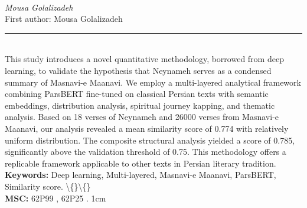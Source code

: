\documentclass[10pt,twoside]{article}
\begin{document}
\noindent\begin{minipage}[t][\textheight]{\textwidth}
\\[0.35em]
{\itshape Mousa Golalizadeh}\\[0.2em]
{\footnotesize First author: Mousa Golalizadeh}\\[0.45em]
\noindent\rule{\textwidth}{0.3pt}\\[0.4em]
{\footnotesize  This study introduces a novel quantitative methodology, borrowed from deep learning, to validate the hypothesis that Neynameh serves as a condensed summary of Masnavi-e Maanavi. We employ a multi-layered analytical framework combining ParsBERT fine-tuned on classical Persian texts with semantic embeddings, distribution analysis, spiritual journey kapping, and thematic analysis. Based on 18 verses of Neynameh and 26000 verses from Masnavi-e Maanavi, our analysis revealed a mean similarity score of 0.774 with relatively uniform distribution. The composite structural analysis yielded a score of 0.785, significantly above the validation threshold of 0.75. This methodology offers a replicable framework applicable to other texts in Persian literary tradition.}\\[0.4em]
{\footnotesize\bfseries Keywords:} {\footnotesize Deep learning, Multi-layered, Masnavi-e Maanavi, ParsBERT, Similarity score. \textbackslash\{\}\textbackslash\{\}}\\[0.15em]
{\footnotesize\bfseries MSC:} {\footnotesize 62P99 , 62P25 . 1cm}\\
\vfill
\end{minipage}
\newpage
\end{document}
